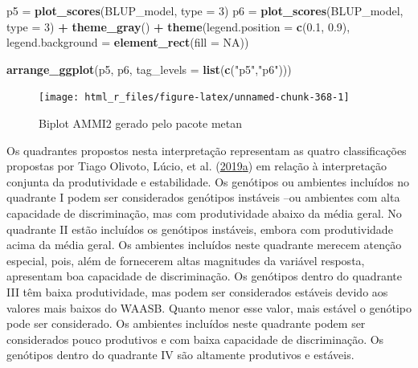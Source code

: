 \documentclass[
]{book}
\newenvironment{Shaded}{\begin{snugshade}}{\end{snugshade}}
\newcommand{\DataTypeTok}[1]{\textcolor[rgb]{0.13,0.29,0.53}{#1}}
\newcommand{\DecValTok}[1]{\textcolor[rgb]{0.00,0.00,0.81}{#1}}
\newcommand{\FloatTok}[1]{\textcolor[rgb]{0.00,0.00,0.81}{#1}}
\newcommand{\KeywordTok}[1]{\textcolor[rgb]{0.13,0.29,0.53}{\textbf{#1}}}
\newcommand{\NormalTok}[1]{#1}
\newcommand{\OperatorTok}[1]{\textcolor[rgb]{0.81,0.36,0.00}{\textbf{#1}}}
\newcommand{\OtherTok}[1]{\textcolor[rgb]{0.56,0.35,0.01}{#1}}
\newcommand{\StringTok}[1]{\textcolor[rgb]{0.31,0.60,0.02}{#1}}
\numberwithin{equation}{section}
\begin{document}
\begin{Shaded}
\begin{Highlighting}[]
\NormalTok{p5 =}\StringTok{ }\KeywordTok{plot\_scores}\NormalTok{(BLUP\_model, }\DataTypeTok{type =} \DecValTok{3}\NormalTok{)}
\NormalTok{p6 =}\StringTok{ }\KeywordTok{plot\_scores}\NormalTok{(BLUP\_model, }\DataTypeTok{type =} \DecValTok{3}\NormalTok{) }\OperatorTok{+}
\StringTok{                 }\KeywordTok{theme\_gray}\NormalTok{() }\OperatorTok{+}
\StringTok{                 }\KeywordTok{theme}\NormalTok{(}\DataTypeTok{legend.position =} \KeywordTok{c}\NormalTok{(}\FloatTok{0.1}\NormalTok{, }\FloatTok{0.9}\NormalTok{),}
                       \DataTypeTok{legend.background =} \KeywordTok{element\_rect}\NormalTok{(}\DataTypeTok{fill =} \OtherTok{NA}\NormalTok{))}

\KeywordTok{arrange\_ggplot}\NormalTok{(p5, p6, }\DataTypeTok{tag\_levels =} \KeywordTok{list}\NormalTok{(}\KeywordTok{c}\NormalTok{(}\StringTok{"p5"}\NormalTok{,}\StringTok{"p6"}\NormalTok{)))}
\end{Highlighting}
\end{Shaded}

\begin{figure}

{\centering \texttt{[image: html\_r\_files/figure-latex/unnamed-chunk-368-1]} 

}

\caption{Biplot AMMI2 gerado pelo pacote metan}\label{fig:unnamed-chunk-368}
\end{figure}

Os quadrantes propostos nesta interpretação representam as quatro classificações propostas por Tiago Olivoto, Lúcio, et al. (\protect\hyperlink{ref-Olivoto2019}{2019}\protect\hyperlink{ref-Olivoto2019}{a}) em relação à interpretação conjunta da produtividade e estabilidade. Os genótipos ou ambientes incluídos no quadrante I podem ser considerados genótipos instáveis --ou ambientes com alta capacidade de discriminação, mas com produtividade abaixo da média geral. No quadrante II estão incluídos os genótipos instáveis, embora com produtividade acima da média geral. Os ambientes incluídos neste quadrante merecem atenção especial, pois, além de fornecerem altas magnitudes da variável resposta, apresentam boa capacidade de discriminação. Os genótipos dentro do quadrante III têm baixa produtividade, mas podem ser considerados estáveis devido aos valores mais baixos do WAASB. Quanto menor esse valor, mais estável o genótipo pode ser considerado. Os ambientes incluídos neste quadrante podem ser considerados pouco produtivos e com baixa capacidade de discriminação. Os genótipos dentro do quadrante IV são altamente produtivos e estáveis.
\end{document}
